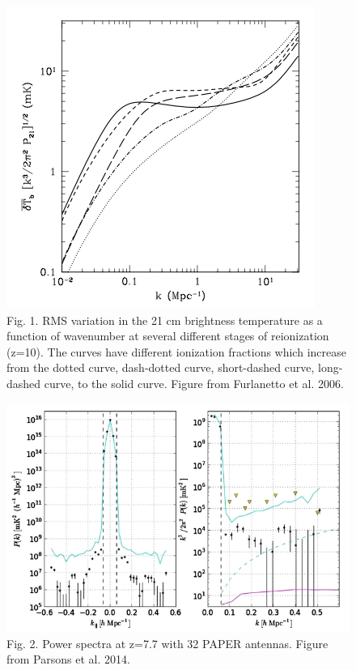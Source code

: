 \documentclass[12pt]{article}
\begin{document}
\begin{figure}[H]
\centering
\includegraphics[totalheight=0.4\textheight]{furlanettoetal.png}
\caption{Fig. 1. RMS variation in the 21 cm brightness temperature as a function of wavenumber at several different stages of reionization (z=10). The curves have different ionization fractions which increase from the dotted curve, dash-dotted curve, short-dashed curve, long-dashed curve, to the solid curve. Figure from Furlanetto et al. 2006.}
\end{figure}

\begin{figure}[H]
\centering
\includegraphics[totalheight=0.4\textheight]{parsonsetal.png}
\caption{Fig. 2. Power spectra at z=7.7 with 32 PAPER antennas. Figure from Parsons et al. 2014.}
\end{figure}
\end{document}
